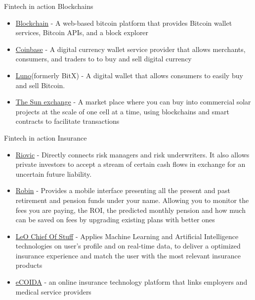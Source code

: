 \documentclass[9pt]{beamer}
\begin{document}
\begin{frame}{Fintech in action}
	Blockchains
	\begin{itemize}
		\item \href{http://blockchain.com/}{Blockchain} - A web-based bitcoin platform that provides Bitcoin wallet services, Bitcoin APIs, and a block explorer
		\item \href{https://www.coinbase.com}{Coinbase} - A digital currency wallet service provider that allows merchants, consumers, and traders to to buy and sell digital currency
		\item \href{https://www.luno.com/en/}{Luno}(formerly BitX) - A digital wallet that allows consumers to easily buy and sell Bitcoin. %
		\item \href{https://thesunexchange.com/}{The Sun exchange} - A market place where you can buy into commercial solar projects at the scale of one cell at a time, using blockchains and smart contracts to facilitate transactions
	\end{itemize}
\end{frame}



\begin{frame}{Fintech in action}
	Insurance
	\begin{itemize}
		\item \href{riovic.com/}{Riovic} - Directly connects risk managers and risk underwriters. It also allows private investors to accept a stream of certain cash flows in exchange for an uncertain future liability.
		\item \href{https://www.robinhoodpro.com}{Robin} - Provides a mobile interface presenting all the present and past retirement and pension funds under your name. Allowing you to monitor the fees you are paying, the ROI, the predicted monthly pension and how much can be saved on fees by upgrading existing plans with better ones
		\item \href{http://www.meetleo.co}{LeO Chief Of Stuff} - Applies Machine Learning and Artificial Intelligence technologies on user's profile and on real-time data, to deliver a optimized insurance experience and match the user with the most relevant insurance products
		\item \href{compsol.co.za/}{eCOIDA} - an online insurance technology platform that links employers and medical service providers
	\end{itemize}
\end{frame}
\end{document}
